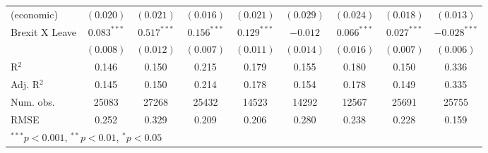\documentclass[12pt, letter]{article}
\begin{document}
\begin{table}[H]
\begin{center}
{\begin{tabular}{l c c c c c c c c }
    (economic)                             & $(0.020)$      & $(0.021)$      & $(0.016)$      & $(0.021)$      & $(0.029)$      & $(0.024)$      & $(0.018)$      & $(0.013)$      \\
Brexit X Leave                   & $0.083^{***}$  & $0.517^{***}$  & $0.156^{***}$  & $0.129^{***}$  & $-0.012$       & $0.066^{***}$  & $0.027^{***}$  & $-0.028^{***}$ \\
                                 & $(0.008)$      & $(0.012)$      & $(0.007)$      & $(0.011)$      & $(0.014)$      & $(0.016)$      & $(0.007)$      & $(0.006)$      \\
\hline
R$^2$                            & 0.146          & 0.150          & 0.215          & 0.179          & 0.155          & 0.180          & 0.150          & 0.336          \\
Adj. R$^2$                       & 0.145          & 0.150          & 0.214          & 0.178          & 0.154          & 0.178          & 0.149          & 0.335          \\
Num. obs.                        & 25083          & 27268          & 25432          & 14523          & 14292          & 12567          & 25691          & 25755          \\
RMSE                             & 0.252          & 0.329          & 0.209          & 0.206          & 0.280          & 0.238          & 0.228          & 0.159          \\
\hline
\multicolumn{9}{l}{\scriptsize{$^{***}p<0.001$, $^{**}p<0.01$, $^*p<0.05$}}
\end{tabular}}
\end{center}
\end{table}
\end{document}
